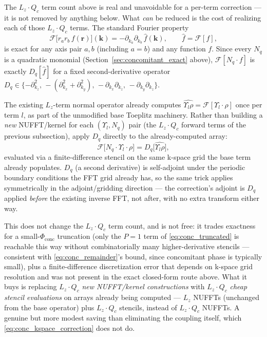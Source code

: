 \documentclass{article}
\begin{document}
The $L_z\cdot Q_c$ term count above is real and unavoidable for a per-term correction — it is not
removed by anything below. What \emph{can} be reduced is the cost of realizing each of those
$L_z\cdot Q_c$ terms. The standard Fourier property
\begin{equation}
    \mathcal{F}\bigl[r_a r_b\,f(\mathbf{r})\bigr](\mathbf{k}) = -\partial_{k_a}\partial_{k_b}\,
        \hat f(\mathbf{k}), \qquad \hat f = \mathcal{F}[f],
    \label{eq:ft_monomial_derivative}
\end{equation}
is exact for any axis pair $a,b$ (including $a{=}b$) and any function $f$. Since every $N_q$ is a
quadratic monomial (Section~\ref{sec:concomitant_exact} above), $\mathcal{F}[N_q\cdot f]$ is
exactly $D_q[\hat f]$ for a fixed second-derivative operator $D_q\in\{-\partial_{k_z}^2,\,
-(\partial_{k_x}^2+\partial_{k_y}^2),\,-\partial_{k_x}\partial_{k_z},\,-\partial_{k_y}\partial_{k_z}\}$.

The existing $L_z$-term normal operator already computes $\widehat{\Upsilon_l\rho} =
\mathcal{F}[\Upsilon_l\cdot\rho]$ once per term $l$, as part of the unmodified base Toeplitz
machinery. Rather than building a \emph{new} NUFFT/kernel for each $(\Upsilon_l, N_q)$ pair
(the $L_z\cdot Q_c$ forward terms of the previous subsection), apply $D_q$ directly to the
already-computed array:
\begin{equation}
    \mathcal{F}\bigl[N_q\cdot\Upsilon_l\cdot\rho\bigr] = D_q\bigl[\widehat{\Upsilon_l\rho}\bigr],
    \label{eq:conc_kspace_correction}
\end{equation}
evaluated via a finite-difference stencil on the same k-space grid the base term already
populates. $D_q$ (a second derivative) is self-adjoint under the periodic boundary conditions the
FFT grid already has, so the same trick applies symmetrically in the adjoint/gridding direction —
the correction's adjoint is $D_q$ applied \emph{before} the existing inverse FFT, not after,
with no extra transform either way.

This does not change the $L_z\cdot Q_c$ term count, and is not free: it trades exactness for a
small-$\Phi_{\mathrm{conc}}$ truncation (only the $P{=}1$ term of
\eqref{eq:conc_truncated} is reachable this way without combinatorially many higher-derivative
stencils — consistent with \eqref{eq:conc_remainder}'s bound, since concomitant phase is
typically small), plus a finite-difference discretization error that depends on k-space grid
resolution and was not present in the exact closed-form route above. What it buys is replacing
$L_z\cdot Q_c$ \emph{new NUFFT/kernel constructions} with $L_z\cdot Q_c$ \emph{cheap stencil
evaluations} on arrays already being computed — $L_z$ NUFFTs (unchanged from the base operator)
plus $L_z\cdot Q_c$ stencils, instead of $L_z\cdot Q_c$ NUFFTs. A genuine but more modest saving
than eliminating the coupling itself, which \eqref{eq:conc_kspace_correction} does not do.
\end{document}
